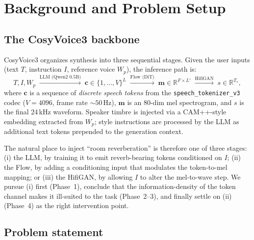 \documentclass{article}
\begin{document}
\section{Background and Problem Setup}

\subsection{The CosyVoice3 backbone}

CosyVoice3 organizes synthesis into three sequential stages. Given the user
inputs (text $T$, instruction $I$, reference voice $W_p$), the inference path
is:
\begin{equation}
T,I,W_p \;\xrightarrow{\text{LLM (Qwen2 0.5B)}}\; \mathbf{c} \in \{1,\dots,V\}^{L}
\;\xrightarrow{\text{Flow (DiT)}}\; \mathbf{m} \in \mathbb{R}^{F\times L'}
\;\xrightarrow{\text{HifiGAN}}\; s \in \mathbb{R}^{T_s},
\end{equation}
where $\mathbf{c}$ is a sequence of \emph{discrete speech tokens} from the
\texttt{speech\_tokenizer\_v3} codec ($V = 4096$, frame rate
$\sim 50$\,Hz), $\mathbf{m}$ is an $80$-dim mel spectrogram, and $s$ is the
final 24\,kHz waveform. Speaker timbre is injected via a CAM++-style
embedding extracted from $W_p$; style instructions are processed by the LLM as
additional text tokens prepended to the generation context.

The natural place to inject ``room reverberation'' is therefore one of three
stages: (i) the LLM, by training it to emit reverb-bearing tokens conditioned on
$I$; (ii) the Flow, by adding a conditioning input that modulates the
token-to-mel mapping; or (iii) the HifiGAN, by allowing $I$ to alter the
mel-to-wave step. We pursue (i) first (Phase~1), conclude that the
information-density of the token channel makes it ill-suited to the task
(Phase~2--3), and finally settle on (ii) (Phase~4) as the right intervention
point.

\subsection{Problem statement}
\end{document}

